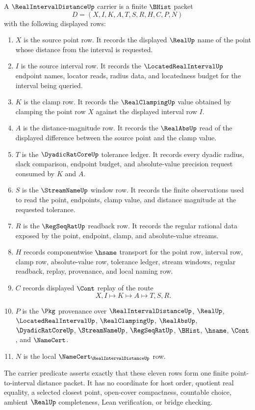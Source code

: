 \begin{definition}
\label{def:real-interval-distance-carrier}
A $\RealIntervalDistanceUp$ carrier is a finite $\BHist$ packet
$$
D=(X,I,K,A,T,S,R,H,C,P,N)
$$
with the following displayed rows:
\begin{enumerate}
\item $X$ is the source point row. It records the displayed $\RealUp$ name of the point whose distance from the interval is requested.
\item $I$ is the source interval row. It records the $\LocatedRealIntervalUp$ endpoint names, locator reads, radius data, and locatedness budget for the interval being queried.
\item $K$ is the clamp row. It records the $\RealClampingUp$ value obtained by clamping the point row $X$ against the displayed interval row $I$.
\item $A$ is the distance-magnitude row. It records the $\RealAbsUp$ read of the displayed difference between the source point and the clamp value.
\item $T$ is the $\DyadicRatCoreUp$ tolerance ledger. It records every dyadic radius, slack comparison, endpoint budget, and absolute-value precision request consumed by $K$ and $A$.
\item $S$ is the $\StreamNameUp$ window row. It records the finite observations used to read the point, endpoints, clamp value, and distance magnitude at the requested tolerance.
\item $R$ is the $\RegSeqRatUp$ readback row. It records the regular rational data exposed by the point, endpoint, clamp, and absolute-value streams.
\item $H$ records componentwise $\hsame$ transport for the point row, interval row, clamp row, absolute-value row, tolerance ledger, stream windows, regular readback, replay, provenance, and local naming row.
\item $C$ records displayed $\Cont$ replay of the route
$$
X,I \longmapsto K \longmapsto A \longmapsto T,S,R .
$$
\item $P$ is the $\Pkg$ provenance over $\RealIntervalDistanceUp$, $\RealUp$, $\LocatedRealIntervalUp$, $\RealClampingUp$, $\RealAbsUp$, $\DyadicRatCoreUp$, $\StreamNameUp$, $\RegSeqRatUp$, $\BHist$, $\hsame$, $\Cont$, and $\NameCert$.
\item $N$ is the local $\NameCert_{\RealIntervalDistanceUp}$ row.
\end{enumerate}
The carrier predicate asserts exactly that these eleven rows form one finite point-to-interval distance packet. It has no coordinate for host order, quotient real equality, a selected closest point, open-cover compactness, countable choice, ambient $\RealUp$ completeness, Lean verification, or bridge checking.
\end{definition}

